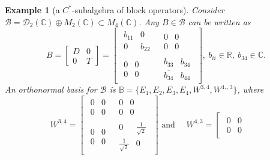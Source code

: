 \documentclass[12pt,a4paper]{article}
\def\calB{\mathcal B}
\def\calD{\mathcal D}
\def\R{\mathbb R}
\def\C{\mathbb C}
\newtheorem{example}{Example}
\numberwithin{equation}{section}
\begin{document}
\begin{example}[a $C^*$-subalgebra of block operators]
	Consider $\calB= \calD_2(\C)\oplus M_2(\C)\subset M_4(\C)$. Any $B\in \calB$ can be written as
	\[
	B = \left[ 
	\begin{array}{c|c}
		D & 0
		\\
		\hline
		0 & T
	\end{array} 
	\right]= \left[ 
	\begin{array}{c|c}
		\begin{matrix}
			b_{11}&0\\
			0&b_{22}
		\end{matrix} & \begin{matrix}
			0&0\\
			0&0
		\end{matrix} \\
		\hline
		\begin{matrix}
			0&0\\
			0&0
		\end{matrix} & \begin{matrix}
		b_{33}&b_{34}\\
		\overline{b_{34}}&b_{44}
		\end{matrix}
	\end{array} 
	\right],\ b_{ii}\in \R, \ b_{34}\in \C.
	\]
	An orthonormal basis for $\calB$ is $\mathbb{B}=\{E_1,E_2,E_3,E_4, W^{3,4}, W^{4,,3}\}$, where
	\[
	W^{3,4} = \left[ 
	\begin{array}{c|c}
		\begin{matrix}
			0&0\\
			0&0
		\end{matrix} & \begin{matrix}
			0&0\\
			0&0
		\end{matrix} \\
		\hline
		\begin{matrix}
			0&0\\
			0&0
		\end{matrix} & \begin{matrix}
			0&\frac{1}{\sqrt{2}}\\
			\frac{1}{\sqrt{2}}&0
		\end{matrix}
	\end{array} 
	\right]\text{ and }\quad W^{4,3} = \left[ 
	\begin{array}{c|c}
		\begin{matrix}
			0&0\\
			0&0
		\end{matrix} & \begin{matrix}

\end{matrix}
\end{array}\]
\end{example}
\end{document}
